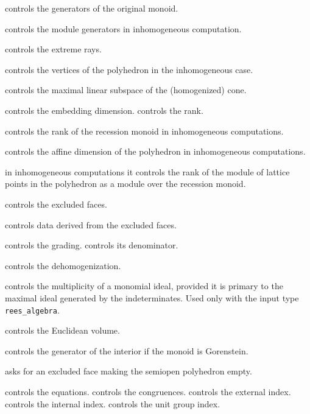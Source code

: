 \begin{itemize}
	
	\itemtt[OriginalMonoidGenerators] controls the generators of the original monoid.
	
	\itemtt[ModuleGenerators] controls the module generators in inhomogeneous computation.
	
	\itemtt[ExtremeRays] controls the extreme rays.
	
	\itemtt[VerticesOfPolyhedron] controls the vertices of the polyhedron in the inhomogeneous case.
	
	\itemtt[MaximalSubspace] controls the maximal linear subspace of the (homogenized) cone.
	
	\itemtt[EmbeddingDim] controls the embedding dimension.
	\itemtt[Rank] controls the rank.
	
	\itemtt[RecessionRank] controls the rank of the recession monoid in inhomogeneous computations.
	
	\itemtt[AffineDim] controls the affine dimension of the polyhedron in inhomogeneous computations.
	
	\itemtt[ModuleRank] in inhomogeneous computations it controls the rank of the module of lattice points in the polyhedron as a module over the recession monoid.
	
	\itemtt[ExcludedFaces] controls the excluded faces.
	
	\itemtt[InclusionExclusionData] controls data derived from the excluded faces.
	
	\itemtt[Grading] controls the grading.
	\itemtt[GradingDenom] controls its denominator.
	
	\itemtt[Dehomogenization] controls the dehomogenization.
	
	\itemtt[ReesPrimaryMultiplicity] controls the multiplicity of a monomial ideal, provided it is primary to the maximal ideal generated by the indeterminates. Used only with the input type \verb|rees_algebra|.
	
	\itemtt[EuclideanVolume]controls the Euclidean volume.
	
	\itemtt[GeneratorOfInterior] controls the generator of the interior if the monoid is Gorenstein.
	
	\itemtt[CoveringFace] asks for an excluded face making the semiopen polyhedron empty.
	
	\itemtt[Equations] controls the equations.
	\itemtt[Congruences] controls the congruences.
	\itemtt[ExternalIndex] controls the external index.
	\itemtt[InternalIndex] controls the internal index.
	\itemtt[UnitGroupIndex] controls the unit group index.	
	

\end{itemize}
